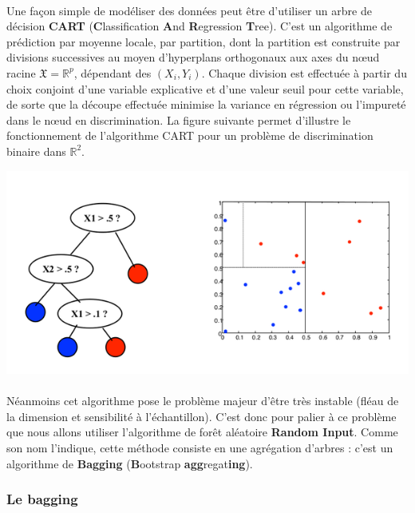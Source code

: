 \documentclass[14pt, openany]{article}
\begin{document}
\paragraph{}
Une façon simple de modéliser des données peut être d'utiliser un arbre de décision \textbf{CART} (\textbf{C}lassification \textbf{A}nd \textbf{R}egression \textbf{T}ree). C'est un algorithme de prédiction par moyenne locale, par partition, dont la partition est construite par divisions successives au moyen d'hyperplans orthogonaux aux axes du nœud racine $\mathfrak{X}=\mathbb{R}^{p}$, dépendant des $(X_i,Y_i)$. Chaque division est effectuée à partir du choix conjoint d'une variable explicative et d'une valeur seuil pour cette variable, de sorte que la découpe effectuée minimise la variance en régression ou l'impureté dans le nœud en discrimination. La figure suivante permet d'illustre le fonctionnement de l'algorithme CART pour un problème de discrimination binaire dans $\mathbb{R}^2$.
\begin{center}
\includegraphics[scale=0.55]{Images/cart.png}
\end{center}
\paragraph{}
Néanmoins cet algorithme pose le problème majeur d'être très instable (fléau de la dimension et sensibilité à l'échantillon). C'est donc pour palier à ce problème que nous allons utiliser l'algorithme de forêt aléatoire \textbf{Random Input}. Comme son nom l'indique, cette méthode consiste en une agrégation d'arbres : c'est un algorithme de \textbf{Bagging} (\textbf{B}ootstrap \textbf{agg}regat\textbf{ing}). 
\subsubsection{Le bagging}
\end{document}
